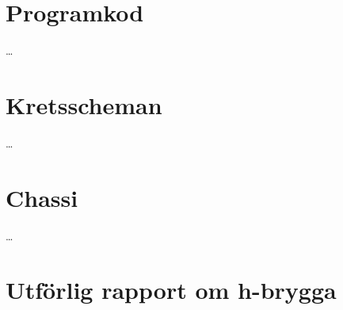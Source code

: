 \appendix

\section{Programkod}
\ldots
\section{Kretsscheman}
\ldots
\section{Chassi}
\ldots
\section{Utförlig rapport om h-brygga}
